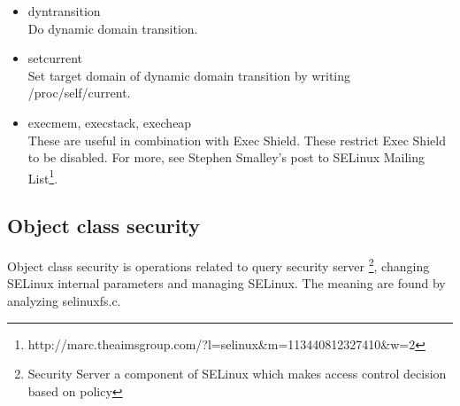 \documentclass{article}
\begin{document}
\begin{itemize}
 \item dyntransition       \\
       Do dynamic domain transition.
 \item setcurrent\\
       Set target domain of dynamic domain transition by writing
       /proc/self/current.
 \item execmem, execstack, execheap\\
       These are useful in combination with
       Exec Shield\cite{ExecShield}. These restrict Exec Shield to be
       disabled. For more, see Stephen Smalley's post to SELinux Mailing
       List\footnote{http://marc.theaimsgroup.com/?l=selinux\&m=113440812327410\&w=2}. 
\end{itemize}

	
\subsection{Object class security}
Object class security is operations related to query security
server \footnote {Security Server a component of SELinux which makes
access control decision based on policy },
changing SELinux internal parameters and managing SELinux. The meaning
are found by analyzing selinuxfs.c.
\end{document}
